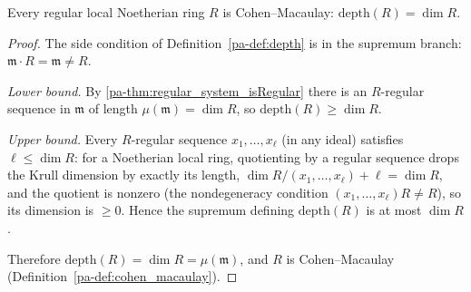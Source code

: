 \begin{theorem}
  \label{pa-thm:regular_is_CM}
  \leanok

  Every regular local Noetherian ring \(R\) is Cohen--Macaulay:
  \(\mathrm{depth}(R) = \dim R\).
\end{theorem}
\begin{proof}
  \leanok
  The side condition of Definition~\ref{pa-def:depth} is in the supremum branch:
  \(\mathfrak m \cdot R = \mathfrak m \neq R\).

  \emph{Lower bound.} By \ref{pa-thm:regular_system_isRegular} there is an \(R\)-regular
  sequence in \(\mathfrak m\) of length \(\mu(\mathfrak m) = \dim R\), so
  \(\mathrm{depth}(R) \geq \dim R\).

  \emph{Upper bound.} Every \(R\)-regular sequence \(x_1, \dots, x_\ell\) (in any
  ideal) satisfies \(\ell \leq \dim R\): for a Noetherian local ring, quotienting by a
  regular sequence drops the Krull dimension by exactly its length,
  \(\dim R/(x_1, \dots, x_\ell) + \ell = \dim R\), and the quotient is nonzero (the
  nondegeneracy condition \((x_1, \dots, x_\ell)R \neq R\)), so its dimension is
  \(\geq 0\). Hence the supremum defining \(\mathrm{depth}(R)\) is at most
  \(\dim R\).

  Therefore \(\mathrm{depth}(R) = \dim R = \mu(\mathfrak m)\), and \(R\) is
  Cohen--Macaulay (Definition~\ref{pa-def:cohen_macaulay}).
\end{proof}
